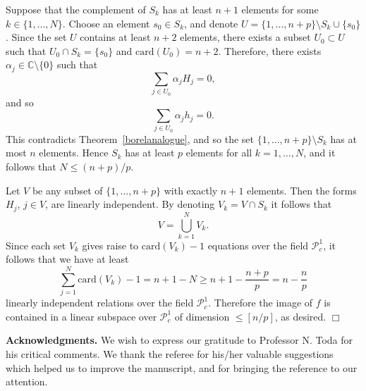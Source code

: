 \documentclass{amsart}
\newcommand{\C}{\mathbb{C}}
\newcommand{\card}{\mathrm{card}}
\theoremstyle{definition}
\numberwithin{equation}{section}
\numberwithin{theorem}{section}
\begin{document}
Suppose that the complement of $S_k$ has at least $n+1$ elements
for some $k\in\{1,\ldots,N\}$. Choose an element $s_0\in S_k$, and
denote $U=\{1,\ldots,n+p\}\setminus S_k\cup\{s_0\}$. Since the set
$U$ contains at least $n+2$ elements, there exists a subset
$U_0\subset U$ such that $U_0\cap S_k=\{s_0\}$ and
$\card(U_0)=n+2$. Therefore, there exists $\alpha_j\in
\C\setminus\{0\}$ such that
    \begin{equation*}
    \sum_{j\in U_0}\alpha_j H_j =0,
    \end{equation*}
and so
    \begin{equation*}
    \sum_{j\in U_0} \alpha_j h_j =0.
    \end{equation*}
This contradicts Theorem~\ref{borelanalogue}, and so the set
$\{1,\ldots,n+p\}\setminus S_k$ has at most $n$ elements. Hence
$S_k$ has at least $p$ elements for all $k=1,\ldots,N$, and it
follows that $N\leq (n+p)/p$.

Let $V$ be any subset of $\{1,\ldots,n+p\}$ with exactly $n+1$
elements. Then the forms $H_j$, $j\in V$, are linearly
independent. By denoting $V_k=V\cap S_k$ it follows that
    \begin{equation*}
    V=\bigcup_{k=1}^N V_k.
    \end{equation*}
Since each set $V_k$ gives raise to $\card(V_k)-1$ equations over the field $\mathcal{P}_c^1$, it
follows that we have at least
    \begin{equation*}
    \sum_{j=1}^N \card(V_k)-1 = n+1-N \geq
    n+1-\frac{n+p}{p}=n-\frac{n}{p}
    \end{equation*}
linearly independent relations over the field $\mathcal{P}_c^1$. Therefore the
image of $f$ is contained in a linear subspace over $\mathcal{P}_c^1$ of
dimension $\leq[n/p]$, as desired. \hfill$\Box$

\medskip

\noindent \textbf{Acknowledgments. } We wish to express our gratitude to Professor N. Toda for his critical comments. We thank the referee for his/her valuable suggestions which helped us to improve the manuscript, and for bringing the reference \cite{wonglw:09} to our attention.


\end{document}
